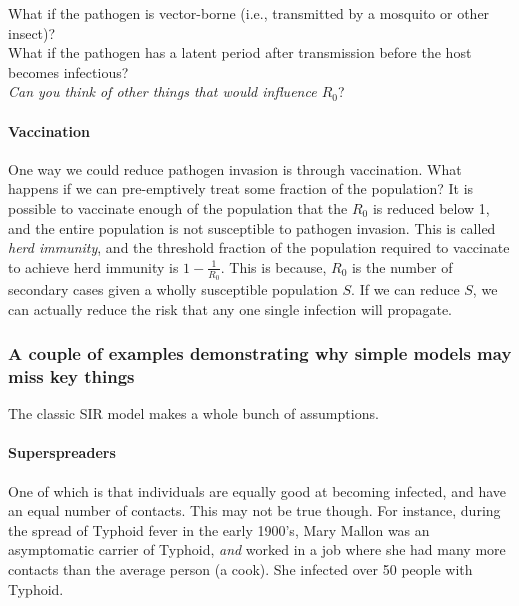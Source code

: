 \documentclass[12pt]{article}
\begin{document}
What if the pathogen is vector-borne (i.e., transmitted by a mosquito or other insect)? \\

What if the pathogen has a latent period after transmission before the host becomes infectious? \\

\textit{Can you think of other things that would influence $R_0$}? 














\paragraph*{Vaccination}

One way we could reduce pathogen invasion is through vaccination. What happens if we can pre-emptively treat some fraction of the population? It is possible to vaccinate enough of the population that the $R_0$ is reduced below 1, and the entire population is not susceptible to pathogen invasion. This is called \textit{herd immunity}, and the threshold fraction of the population required to vaccinate to achieve herd immunity is $1 - \frac{1}{R_0}$. This is because, $R_0$ is the number of secondary cases given a wholly susceptible population $S$. If we can reduce $S$, we can actually reduce the risk that any one single infection will propagate.  











\subsubsection*{A couple of examples demonstrating why simple models may miss key things}

The classic SIR model makes a whole bunch of assumptions. 

\paragraph*{Superspreaders} 

One of which is that individuals are equally good at becoming infected, and have an equal number of contacts. This may not be true though. For instance, during the spread of Typhoid fever in the early 1900's, Mary Mallon was an asymptomatic carrier of Typhoid, \textit{and} worked in a job where she had many more contacts than the average person (a cook). She infected over 50 people with Typhoid. 
\end{document}
